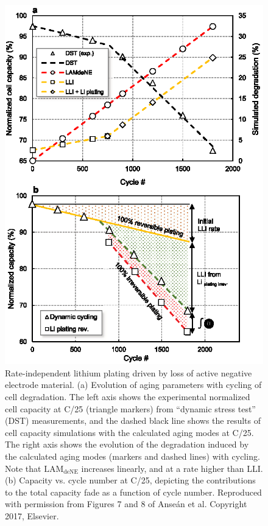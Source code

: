 \documentclass[journal=jpclcd,manuscript=article]{achemso}
\begin{document}
\begin{figure}[p]
    \centering
    \includegraphics[scale=1]{figures/thermo_plating_dubarry.eps}
    \caption{Rate-independent lithium plating driven by loss of active negative electrode material. (a) Evolution of aging parameters with cycling of cell degradation. The left axis shows the experimental normalized cell capacity at C/25 (triangle markers) from ``dynamic stress test'' (DST) measurements, and the dashed black line shows the results of cell capacity simulations with the calculated aging modes at C/25. The right axis shows the evolution of the degradation induced by the calculated aging modes (markers and dashed lines) with cycling. Note that $\mathrm{LAM_{deNE}}$ increases linearly, and at a rate higher than LLI.
    (b) Capacity vs. cycle number at C/25, depicting the contributions to the total capacity fade as a function of cycle number.
    Reproduced with permission from Figures 7 and 8 of Anse\'an et al.\cite{ansean_operando_2017} Copyright 2017, Elsevier.} 
    \label{fig:thermo_plating}
\end{figure}
\end{document}
